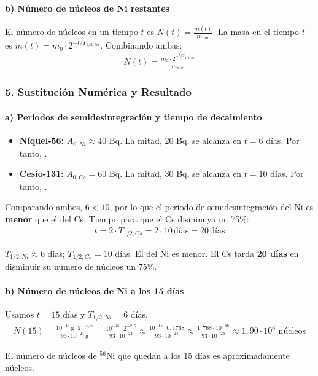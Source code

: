 \paragraph*{b) Número de núcleos de Ni restantes}
El número de núcleos en un tiempo $t$ es $N(t) = \frac{m(t)}{m_{nuc}}$. La masa en el tiempo $t$ es $m(t) = m_0 \cdot 2^{-t/T_{1/2, Ni}}$.
Combinando ambas:
\begin{gather}
    N(t) = \frac{m_0 \cdot 2^{-t/T_{1/2, Ni}}}{m_{nuc}}
\end{gather}

\subsubsection*{5. Sustitución Numérica y Resultado}
\paragraph*{a) Periodos de semidesintegración y tiempo de decaimiento}
\begin{itemize}
    \item \textbf{Níquel-56:} $A_{0,Ni} \approx 40$ Bq. La mitad, 20 Bq, se alcanza en $t=6$ días. Por tanto, .
    \item \textbf{Cesio-131:} $A_{0,Cs} = 60$ Bq. La mitad, 30 Bq, se alcanza en $t=10$ días. Por tanto, .
\end{itemize}
Comparando ambos, $6 < 10$, por lo que el periodo de semidesintegración del Ni es \textbf{menor} que el del Cs.
Tiempo para que el Cs disminuya un 75\%:
\begin{gather}
    t = 2 \cdot T_{1/2, Cs} = 2 \cdot 10 \, \text{días} = 20 \, \text{días}
\end{gather}
\begin{cajaresultado}
    $T_{1/2, Ni} \approx 6$ días; $T_{1/2, Cs} = 10$ días. El del Ni es menor. El Cs tarda \textbf{20 días} en disminuir su número de núcleos un 75\%.
\end{cajaresultado}

\paragraph*{b) Número de núcleos de Ni a los 15 días}
Usamos $t=15$ días y $T_{1/2, Ni}=6$ días.
\begin{gather}
    N(15) = \frac{10^{-15} \, \text{g} \cdot 2^{-15/6}}{93 \cdot 10^{-24} \, \text{g}} = \frac{10^{-15} \cdot 2^{-2,5}}{93 \cdot 10^{-24}} \approx \frac{10^{-15} \cdot 0,1768}{93 \cdot 10^{-24}} \approx \frac{1,768 \cdot 10^{-16}}{93 \cdot 10^{-24}} \approx 1,90 \cdot 10^6 \text{ núcleos}
\end{gather}
\begin{cajaresultado}
    El número de núcleos de ${}^{56}\text{Ni}$ que quedan a los 15 días es aproximadamente  núcleos.
\end{cajaresultado}


